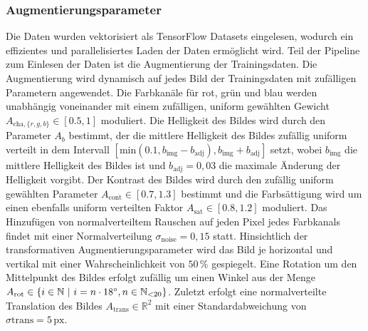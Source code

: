 \subsubsection{Augmentierungsparameter}

Die Daten wurden vektorisiert als TensorFlow Datasets eingelesen, wodurch ein effizientes und parallelisiertes Laden der Daten ermöglicht wird. Teil der Pipeline zum Einlesen der Daten ist die Augmentierung der Trainingsdaten. Die Augmentierung wird dynamisch auf jedes Bild der Trainingsdaten mit zufälligen Parametern angewendet. Die Farbkanäle für rot, grün und blau werden unabhängig voneinander mit einem zufälligen, uniform gewählten Gewicht $A_{\text{cha}, \{r,g,b\}} \in [0.5, 1]$ moduliert. Die Helligkeit des Bildes wird durch den Parameter $A_b$ bestimmt, der die mittlere Helligkeit des Bildes zufällig uniform verteilt in dem Intervall $[\text{min}(0.1, b_\text{img}-b_\text{adj}), b_\text{img} + b_\text{adj}]$ setzt, wobei $b_\text{img}$ die mittlere Helligkeit des Bildes ist und $b_\text{adj} = 0,03$ die maximale Änderung der Helligkeit vorgibt. Der Kontrast des Bildes wird durch den zufällig uniform gewählten Parameter $A_\text{cont} \in [0.7, 1.3]$ bestimmt und die Farbsättigung wird um einen ebenfalls uniform verteilten Faktor $A_\text{sat} \in [0.8, 1.2]$ moduliert. Das Hinzufügen von normalverteiltem Rauschen auf jeden Pixel jedes Farbkanals findet mit einer Normalverteilung $\sigma_\text{noise} = 0,15$ statt. Hinsichtlich der transformativen Augmentierungsparameter wird das Bild je horizontal und vertikal mit einer Wahrscheinlichkeit von $50\,\%$ gespiegelt. Eine Rotation um den Mittelpunkt des Bildes erfolgt zufällig um einen Winkel aus der Menge $A_\text{rot} \in \{i \in \mathbb{N} ~\vert~ i = n \cdot 18^{\circ}, n \in \mathbb{N}_{<20}\}$. Zuletzt erfolgt eine normalverteilte Translation des Bildes $A_\text{trans} \in \mathbb{R}^2$ mit einer Standardabweichung von $\sigma\text{trans} = 5\,\text{px}$.
